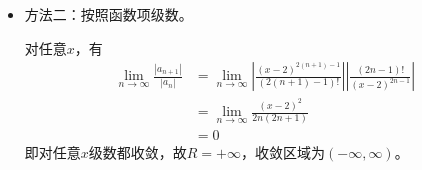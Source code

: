 \documentclass{article}
\begin{document}
\begin{itemize}
\begin{itemize}
                \begin{zremark}
                  注
                  \begin{align*}
                    \lim\limits_{t \to \infty} \sqrt[t]{t!}
                     & = \lim\limits_{t \to \infty} e^{\ln \sqrt[t]{t!}}     \\
                     & = \lim\limits_{t \to \infty} e^{\ln (t!)^\frac{1}{t}} \\
                     & = \lim\limits_{t \to \infty} e^{\frac{1}{t} \ln t!}
                  \end{align*}
                  又
                  \begin{align*}
                    \lim\limits_{t \to \infty} \frac{\ln t!}{t}
                     & = \lim\limits_{t \to \infty} \frac{\ln 1 + \ln 2 + \cdots + \ln t}{t}
                  \end{align*}
                  由于$\{a_n\}, a_n = \ln n$
                  \begin{align*}
                    \lim \limits_{n \to \infty} a_n = +\infty
                  \end{align*}
                  由第二章总习题3可知
                  \begin{align*}
                    \lim\limits_{t \to \infty} \frac{\ln 1 + \ln 2 + \cdots + \ln t}{t} = +\infty
                  \end{align*}
                  综上
                  \begin{align*}
                    \lim\limits_{t \to \infty} \sqrt[t]{t!} = e^{+\infty} = +\infty
                  \end{align*}
                \end{zremark}

          \item 方法二：按照函数项级数。

                对任意$x$，有
                \begin{align*}
                  \lim\limits_{n\to\infty} \frac{|a_{n + 1}|}{|a_n|}
                   & = \lim\limits_{n\to\infty} \left|\frac{(x-2)^{2(n+1) - 1}}{(2(n+1)-1)!}\right| \left|\frac{(2n-1)!}{(x-2)^{2n - 1}}\right| \\
                   & = \lim\limits_{n\to\infty} \frac{(x - 2)^2}{2n(2n+1)}                                                                      \\
                   & = 0
                \end{align*}
                即对任意$x$级数都收敛，故$R = + \infty$，收敛区域为$(- \infty, \infty)$。


\end{itemize}
\end{itemize}
\end{document}
